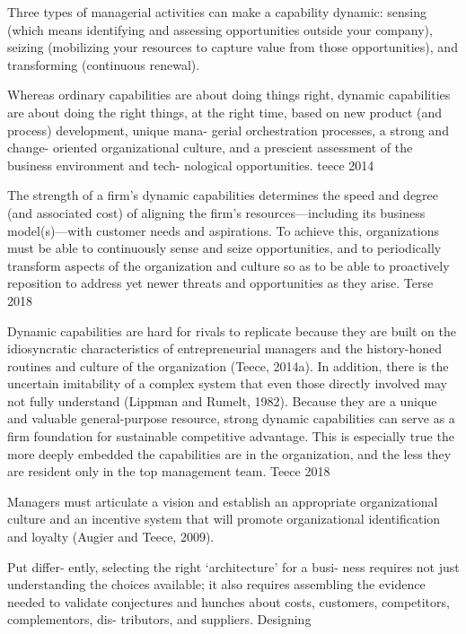 Three types of managerial activities can make a capability dynamic: sensing (which means
identifying and assessing opportunities outside your company), seizing (mobilizing your
resources to capture value from those opportunities), and transforming (continuous
renewal).


Whereas ordinary capabilities are about doing
things right, dynamic capabilities are about doing the right things, at the right time, based on new product (and process) development, unique mana- gerial orchestration processes, a strong and change- oriented organizational culture, and a prescient assessment of the business environment and tech- nological opportunities.
teece 2014


The strength of a firm's dynamic capabilities determines the speed and degree (and
associated cost) of aligning the firm's resources—including its business model(s)—with
customer needs and aspirations. To achieve this, organizations must be able to
continuously sense and seize opportunities, and to periodically transform aspects of the
organization and culture so as to be able to proactively reposition to address yet newer
threats and opportunities as they arise. Terse 2018

Dynamic capabilities are hard for rivals to replicate because they are built on the
idiosyncratic characteristics of entrepreneurial managers and the history-honed routines
and culture of the organization (Teece, 2014a). In addition, there is the uncertain
imitability of a complex system that even those directly involved may not fully understand
(Lippman and Rumelt, 1982). Because they are a unique and valuable general-purpose
resource, strong dynamic capabilities can serve as a firm foundation for sustainable
competitive advantage. This is especially true the more deeply embedded the capabilities
are in the organization, and the less they are resident only in the top management
team. Teece 2018

 Managers must articulate a vision and establish an appropriate organizational culture and an incentive system that will promote organizational identification and loyalty (Augier and Teece, 2009).
 
 

Put differ- ently, selecting the right ‘architecture’ for a busi- ness requires not just understanding the choices available; it also requires assembling the evidence needed to validate conjectures and hunches about costs, customers, competitors, complementors, dis- tributors, and suppliers. Designing

